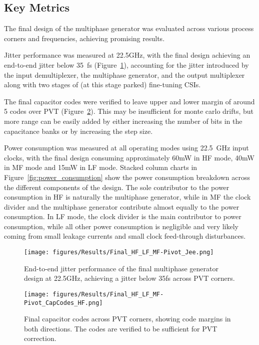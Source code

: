 \subsection{Key Metrics}\label{final_key_metrics}

The final design of the multiphase generator was evaluated across various process corners and frequencies, achieving promising results. 

Jitter performance was measured at 22.5GHz, with the final design achieving an end-to-end jitter below 35~fs (Figure~\ref{fig:final_jitter}), accounting for the jitter introduced by the input demultiplexer, the multiphase generator, and the output multiplexer along with two stages of (at this stage parked) fine-tuning CSIs.

The final capacitor codes were verified to leave upper and lower margin of around 5 codes over PVT (Figure~\ref{fig:final_codes}). This may be insufficient for monte carlo drifts, but more range can be easily added by either increasing the number of bits in the capacitance banks or by increasing the step size.

Power consumption was measured at all operating modes using 22.5~GHz input clocks, with the final design consuming approximately 60mW in HF mode, 40mW in MF mode and 15mW in LF mode. Stacked column charts in Figure~\ref{fig:power_consumption} show the power consumption breakdown across the different components of the design. The sole contributor to the power consumption in HF is naturally the multiphase generator, while in MF the clock divider and the multiphase generator contribute almost equally to the power consumption. In LF mode, the clock divider is the main contributor to power consumption, while all other power consumption is negligible and very likely coming from small leakage currents and small clock feed-through disturbances.

\begin{figure}[H]
  \centering
  \texttt{[image: figures/Results/Final\_HF\_LF\_MF-Pivot\_Jee.png]}
  \caption{End-to-end jitter performance of the final multiphase generator design at 22.5GHz, achieving a jitter below 35fs across PVT corners.}
  \label{fig:final_jitter}
\end{figure}

\begin{figure}[H]
  \centering
  \texttt{[image: figures/Results/Final\_HF\_LF\_MF-Pivot\_CapCodes\_HF.png]}
  \caption{Final capacitor codes across PVT corners, showing code margins in both directions. The codes are verified to be sufficient for PVT correction.}
  \label{fig:final_codes}
\end{figure}


